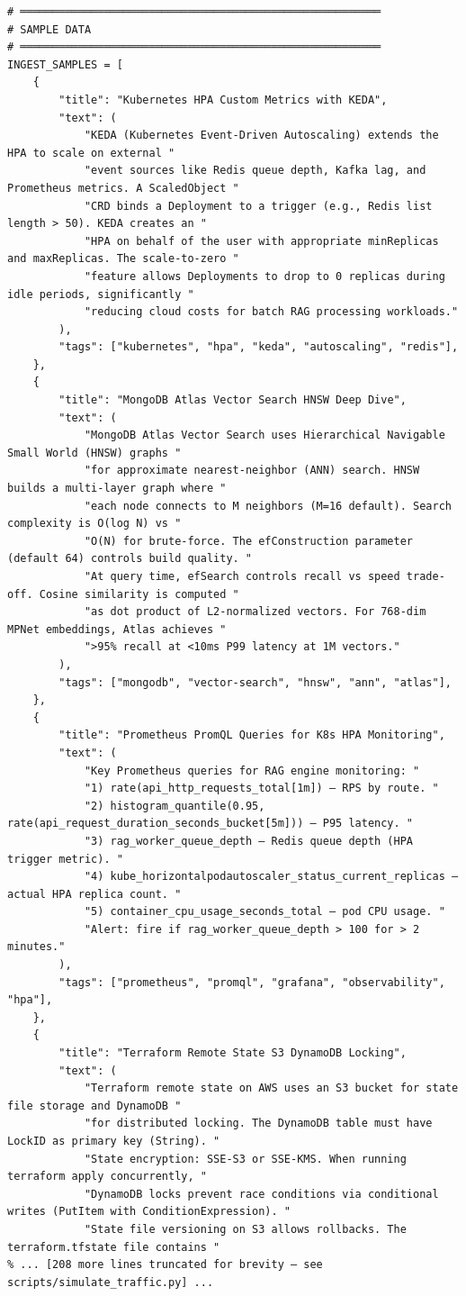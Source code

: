 \documentclass[12pt,a4paper]{report}
\begin{document}
\begin{lstlisting}
# ════════════════════════════════════════════════════════
# SAMPLE DATA
# ════════════════════════════════════════════════════════
INGEST_SAMPLES = [
    {
        "title": "Kubernetes HPA Custom Metrics with KEDA",
        "text": (
            "KEDA (Kubernetes Event-Driven Autoscaling) extends the HPA to scale on external "
            "event sources like Redis queue depth, Kafka lag, and Prometheus metrics. A ScaledObject "
            "CRD binds a Deployment to a trigger (e.g., Redis list length > 50). KEDA creates an "
            "HPA on behalf of the user with appropriate minReplicas and maxReplicas. The scale-to-zero "
            "feature allows Deployments to drop to 0 replicas during idle periods, significantly "
            "reducing cloud costs for batch RAG processing workloads."
        ),
        "tags": ["kubernetes", "hpa", "keda", "autoscaling", "redis"],
    },
    {
        "title": "MongoDB Atlas Vector Search HNSW Deep Dive",
        "text": (
            "MongoDB Atlas Vector Search uses Hierarchical Navigable Small World (HNSW) graphs "
            "for approximate nearest-neighbor (ANN) search. HNSW builds a multi-layer graph where "
            "each node connects to M neighbors (M=16 default). Search complexity is O(log N) vs "
            "O(N) for brute-force. The efConstruction parameter (default 64) controls build quality. "
            "At query time, efSearch controls recall vs speed trade-off. Cosine similarity is computed "
            "as dot product of L2-normalized vectors. For 768-dim MPNet embeddings, Atlas achieves "
            ">95% recall at <10ms P99 latency at 1M vectors."
        ),
        "tags": ["mongodb", "vector-search", "hnsw", "ann", "atlas"],
    },
    {
        "title": "Prometheus PromQL Queries for K8s HPA Monitoring",
        "text": (
            "Key Prometheus queries for RAG engine monitoring: "
            "1) rate(api_http_requests_total[1m]) — RPS by route. "
            "2) histogram_quantile(0.95, rate(api_request_duration_seconds_bucket[5m])) — P95 latency. "
            "3) rag_worker_queue_depth — Redis queue depth (HPA trigger metric). "
            "4) kube_horizontalpodautoscaler_status_current_replicas — actual HPA replica count. "
            "5) container_cpu_usage_seconds_total — pod CPU usage. "
            "Alert: fire if rag_worker_queue_depth > 100 for > 2 minutes."
        ),
        "tags": ["prometheus", "promql", "grafana", "observability", "hpa"],
    },
    {
        "title": "Terraform Remote State S3 DynamoDB Locking",
        "text": (
            "Terraform remote state on AWS uses an S3 bucket for state file storage and DynamoDB "
            "for distributed locking. The DynamoDB table must have LockID as primary key (String). "
            "State encryption: SSE-S3 or SSE-KMS. When running terraform apply concurrently, "
            "DynamoDB locks prevent race conditions via conditional writes (PutItem with ConditionExpression). "
            "State file versioning on S3 allows rollbacks. The terraform.tfstate file contains "
% ... [208 more lines truncated for brevity — see scripts/simulate_traffic.py] ...
\end{lstlisting}
\end{document}
